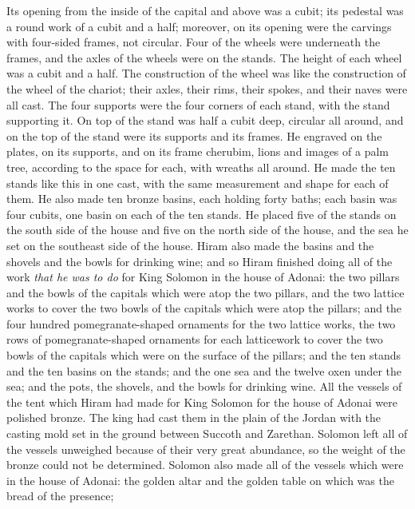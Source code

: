 \begin{biblechapter}
\verse Its opening from the inside of the capital and above was a cubit; its pedestal was a round work of a cubit and a half; moreover, on its opening were the carvings with four-sided frames, not circular.
\verse Four of the wheels were underneath the frames, and the axles of the wheels were on the stands. The height of each wheel was a cubit and a half.
\verse The construction of the wheel was like the construction of the wheel of the chariot; their axles, their rims, their spokes, and their naves were all cast.
\verse The four supports were the four corners of each stand, with the stand supporting it.
\verse On top of the stand was half a cubit deep, circular all around, and on the top of the stand were its supports and its frames.
\verse He engraved on the plates, on its supports, and on its frame cherubim, lions and images of a palm tree, according to the space for each, with wreaths all around.
\verse He made the ten stands like this in one cast, with the same measurement and shape for each of them.
\verse He also made ten bronze basins, each holding forty baths; each basin was four cubits, one basin on each of the ten stands.
\verse He placed five of the stands on the south side of the house and five on the north side of the house, and the sea he set on the southeast side of the house.
\verse Hiram also made the basins and the shovels and the bowls for drinking wine; and so Hiram finished doing all of the work \textit{that he was to do} for King Solomon in the house of Adonai:
\verse the two pillars and the bowls of the capitals which were atop the two pillars, and the two lattice works to cover the two bowls of the capitals which were atop the pillars;
\verse and the four hundred pomegranate-shaped ornaments for the two lattice works, the two rows of pomegranate-shaped ornaments for each latticework to cover the two bowls of the capitals which were on the surface of the pillars;
\verse and the ten stands and the ten basins on the stands;
\verse and the one sea and the twelve oxen under the sea;
\verse and the pots, the shovels, and the bowls for drinking wine. All the vessels of the tent which Hiram had made for King Solomon for the house of Adonai were polished bronze.
\verse The king had cast them in the plain of the Jordan with the casting mold set in the ground between Succoth and Zarethan.
\verse Solomon left all of the vessels unweighed because of their very great abundance, so the weight of the bronze could not be determined.
\verse Solomon also made all of the vessels which were in the house of Adonai: the golden altar and the golden table on which was the bread of the presence;

\end{biblechapter}
